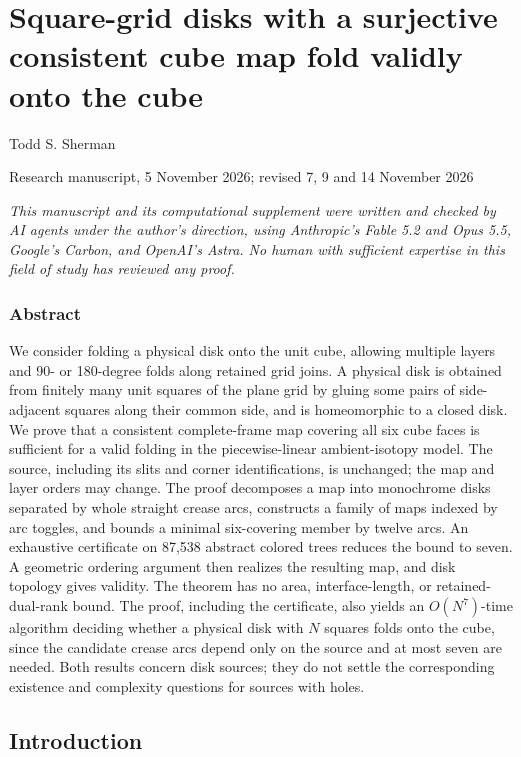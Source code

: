 \documentclass[
  11pt,
]{article}
\author{}
\date{}
\begin{document}
\section{Square-grid disks with a surjective consistent cube map fold
validly onto the
cube}\label{square-grid-disks-with-a-surjective-consistent-cube-map-fold-validly-onto-the-cube}

Todd S. Sherman

Research manuscript, 5 November 2026; revised 7, 9 and 14 November 2026

\emph{This manuscript and its computational supplement were written and
checked by AI agents under the author's direction, using Anthropic's
Fable 5.2 and Opus 5.5, Google's Carbon, and OpenAI's Astra. No human
with sufficient expertise in this field of study has reviewed any
proof.}

\subsubsection{Abstract}\label{abstract}

We consider folding a physical disk onto the unit cube, allowing
multiple layers and 90- or 180-degree folds along retained grid joins. A
physical disk is obtained from finitely many unit squares of the plane
grid by gluing some pairs of side-adjacent squares along their common
side, and is homeomorphic to a closed disk. We prove that a consistent
complete-frame map covering all six cube faces is sufficient for a valid
folding in the piecewise-linear ambient-isotopy model. The source,
including its slits and corner identifications, is unchanged; the map
and layer orders may change. The proof decomposes a map into monochrome
disks separated by whole straight crease arcs, constructs a family of
maps indexed by arc toggles, and bounds a minimal six-covering member by
twelve arcs. An exhaustive certificate on 87,538 abstract colored trees
reduces the bound to seven. A geometric ordering argument then realizes
the resulting map, and disk topology gives validity. The theorem has no
area, interface-length, or retained-dual-rank bound. The proof,
including the certificate, also yields an \(O(N^7)\)-time algorithm
deciding whether a physical disk with \(N\) squares folds onto the cube,
since the candidate crease arcs depend only on the source and at most
seven are needed. Both results concern disk sources; they do not settle
the corresponding existence and complexity questions for sources with
holes.

\subsection{Introduction}\label{introduction}
\end{document}
